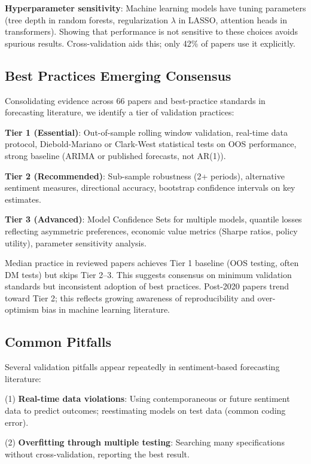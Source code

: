 \documentclass[11pt]{article}
\begin{document}
\textbf{Hyperparameter sensitivity}: Machine learning models have tuning parameters (tree depth in random forests, regularization $\lambda$ in LASSO, attention heads in transformers). Showing that performance is not sensitive to these choices avoids spurious results. Cross-validation aids this; only 42\% of papers use it explicitly.

\subsection{Best Practices Emerging Consensus}

Consolidating evidence across 66 papers and best-practice standards in forecasting literature, we identify a tier of validation practices:

\textbf{Tier 1 (Essential)}: Out-of-sample rolling window validation, real-time data protocol, Diebold-Mariano or Clark-West statistical tests on OOS performance, strong baseline (ARIMA or published forecasts, not AR(1)).

\textbf{Tier 2 (Recommended)}: Sub-sample robustness (2+ periods), alternative sentiment measures, directional accuracy, bootstrap confidence intervals on key estimates.

\textbf{Tier 3 (Advanced)}: Model Confidence Sets for multiple models, quantile losses reflecting asymmetric preferences, economic value metrics (Sharpe ratios, policy utility), parameter sensitivity analysis.

Median practice in reviewed papers achieves Tier 1 baseline (OOS testing, often DM tests) but skips Tier 2--3. This suggests consensus on minimum validation standards but inconsistent adoption of best practices. Post-2020 papers trend toward Tier 2; this reflects growing awareness of reproducibility and over-optimism bias in machine learning literature.

\subsection{Common Pitfalls}

Several validation pitfalls appear repeatedly in sentiment-based forecasting literature:

\noindent
(1) \textbf{Real-time data violations}: Using contemporaneous or future sentiment data to predict outcomes; reestimating models on test data (common coding error). 

\noindent
(2) \textbf{Overfitting through multiple testing}: Searching many specifications without cross-validation, reporting the best result.
\end{document}
